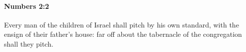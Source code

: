 
		\paragraph{Numbers 2:2} %
			\label{NUMBERS-2-2}

			Every man of the children of Israel shall pitch by his own standard, with the ensign of their father’s house: far off about the tabernacle of the congregation shall they pitch.


